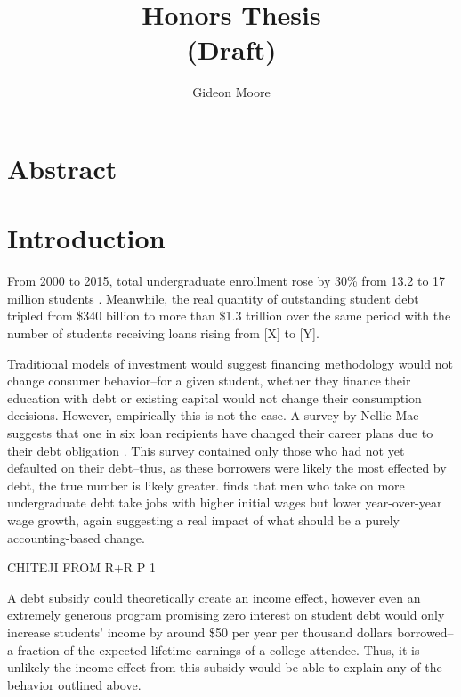 \documentclass{article}
\title{Honors Thesis\\(Draft)}
\author{Gideon Moore}
\begin{document}
	{ \maketitle}
	
	
	\section*{Abstract}
	
	\blindtext
	
	\pagebreak
	
	\section{Introduction}
	
	From 2000 to 2015, total undergraduate enrollment rose by 30\% from 13.2 to 17 million students \parencite{mcfarland2017}. Meanwhile, the real quantity of outstanding student debt tripled from \$340 billion to more than \$1.3 trillion over the same period \parencite{feiveson2018} with the number of students receiving loans rising from [X] to [Y].
	
	Traditional models of investment would suggest financing methodology would not change consumer behavior--for a given student, whether they finance their education with debt or existing capital would not change their consumption decisions. However, empirically this is not the case. A survey by Nellie Mae suggests that one in six loan recipients have changed their career plans due to their debt obligation \parencite{baum2003}. This survey contained only those who had not yet defaulted on their debt--thus, as these borrowers were likely the most effected by debt, the true number is likely greater. \textcite{minicozzi2005} finds that men who take on more undergraduate debt take jobs with higher initial wages but lower year-over-year wage growth, again suggesting a real impact of what should be a purely accounting-based change. 
	
	CHITEJI FROM R+R P 1
	
	A debt subsidy could theoretically create an income effect, however even an extremely generous program promising zero interest on student debt would only increase students' income by around \$50 per year per thousand dollars borrowed--a fraction of the expected lifetime earnings of a college attendee. Thus, it is unlikely the income effect from this subsidy would be able to explain any of the behavior outlined above.
	
\end{document}
